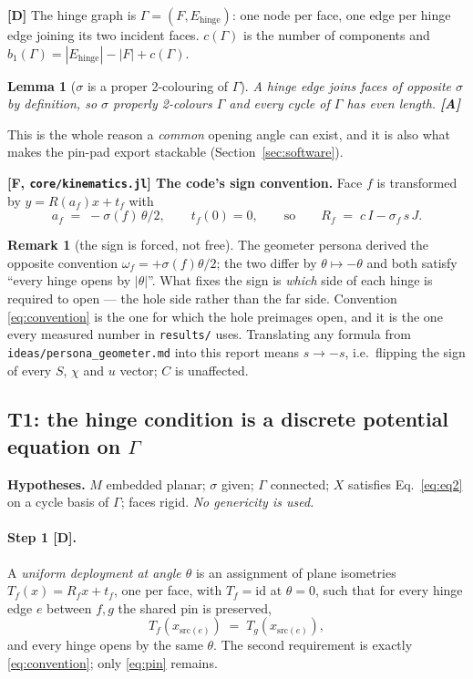 \documentclass[11pt,a4paper]{article}
\newtheorem{lemma}[theorem]{Lemma}
\theoremstyle{definition}
\newtheorem{remark}[theorem]{Remark}
\newcommand{\Ehinge}{E_{\mathrm{hinge}}}
\newcommand{\file}[1]{\texttt{\small #1}}
\begin{document}
\textbf{[D]} The hinge graph is $\Gamma=(F,\Ehinge)$: one node per face, one edge per hinge
edge joining its two incident faces. $c(\Gamma)$ is the number of components and
$b_1(\Gamma)=|\Ehinge|-|F|+c(\Gamma)$.

\begin{lemma}[$\sigma$ is a proper 2-colouring of $\Gamma$]
A hinge edge joins faces of opposite $\sigma$ by definition, so $\sigma$ properly 2-colours
$\Gamma$ and every cycle of $\Gamma$ has even length. \textbf{[A]}
\end{lemma}

\noindent This is the whole reason a \emph{common} opening angle can exist, and it is also
what makes the pin-pad export stackable (Section~\ref{sec:software}).

\textbf{[F, \file{core/kinematics.jl}] The code's sign convention.} Face $f$ is transformed
by $y=R(a_f)x+t_f$ with
\begin{equation}
a_f \;=\; -\sigma(f)\,\theta/2, \qquad t_f(0)=0,
\qquad\text{so}\qquad
R_f \;=\; c\,I - \sigma_f\,s\,J .
\label{eq:convention}
\end{equation}

\begin{remark}[the sign is forced, not free]
The geometer persona derived the opposite convention $\omega_f=+\sigma(f)\theta/2$; the two
differ by $\theta\mapsto-\theta$ and both satisfy ``every hinge opens by $|\theta|$''.
What fixes the sign is \emph{which} side of each hinge is required to open --- the hole side
rather than the far side. Convention \eqref{eq:convention} is the one for which the hole
preimages open, and it is the one every measured number in \file{results/} uses. Translating
any formula from \file{ideas/persona\_geometer.md} into this report means $s\to-s$, i.e.\
flipping the sign of every $S$, $\chi$ and $u$ vector; $C$ is unaffected.
\end{remark}

\subsection{T1: the hinge condition is a discrete potential equation on \texorpdfstring{$\Gamma$}{Gamma}}

\textbf{Hypotheses.} $M$ embedded planar; $\sigma$ given; $\Gamma$ connected; $X$ satisfies
Eq.~\eqref{eq:eq2} on a cycle basis of $\Gamma$; faces rigid. \emph{No genericity is used.}

\paragraph{Step 1 [D].} A \emph{uniform deployment at angle $\theta$} is an assignment of
plane isometries $T_f(x)=R_fx+t_f$, one per face, with $T_f=\mathrm{id}$ at $\theta=0$, such
that for every hinge edge $e$ between $f,g$ the shared pin is preserved,
\begin{equation}
T_f(x_{\mathrm{src}(e)}) \;=\; T_g(x_{\mathrm{src}(e)}),
\label{eq:pin}
\end{equation}
and every hinge opens by the same $\theta$. The second requirement is exactly
\eqref{eq:convention}; only \eqref{eq:pin} remains.
\end{document}
